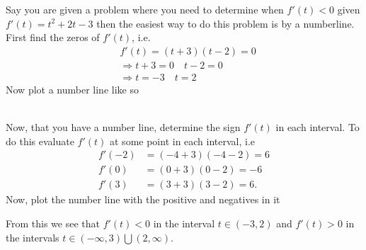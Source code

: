 \documentclass{hwset}
\begin{document}
Say you are given a problem where you need to determine when $f'(t)<0$ given
$f'(t) = t^2+2t-3$ then the easiest way to do this problem is by a numberline.
First find the zeros of $f'(t)$, i.e.
\begin{align*}
	&f'(t) = (t+3)(t-2) = 0 \\
	&\Rightarrow t+3 = 0 \quad t - 2 = 0 \\
	&\Rightarrow t = -3 \quad t = 2
\end{align*}
Now plot a number line like so \\
 \\
Now, that you have a number line, determine the sign $f'(t)$ in each interval.
To do this evaluate $f'(t)$ at some point in each interval, i.e
\begin{align*}
	f'(-2) &= (-4+3)(-4-2) = 6 \\
	f'(0) &= (0 + 3)(0-2) = -6 \\ 
	f'(3) &= (3 + 3)(3-2) = 6. 
\end{align*}
Now, plot the number line with the positive and negatives in it \\
From this we see that $f'(t)<0$ in the interval $t\in(-3,2)$ and $f'(t)>0$ in
the intervals $t\in(-\infty,3)\bigcup (2,\infty)$.
\end{document}

